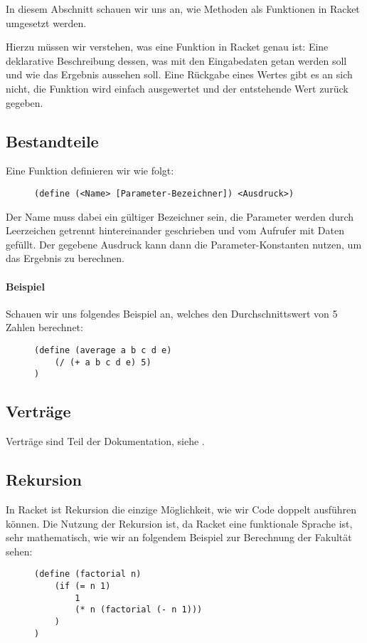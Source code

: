 
In diesem Abschnitt schauen wir uns an, wie Methoden als Funktionen in Racket umgesetzt werden.

Hierzu müssen wir verstehen, was eine Funktion in Racket genau ist: Eine deklarative Beschreibung dessen, was mit den Eingabedaten getan werden soll und wie das Ergebnis aussehen soll. Eine Rückgabe eines Wertes gibt es an sich nicht, die Funktion wird einfach ausgewertet und der entstehende Wert zurück gegeben.

\subsection{Bestandteile} %
	Eine Funktion definieren wir wie folgt:
	\begin{figure}[H]
		\centering
		\lstinline[language = Racket]|(define (<Name> [Parameter-Bezeichner]) <Ausdruck>)|
	\end{figure}
	Der Name muss dabei ein gültiger Bezeichner sein, die Parameter werden durch Leerzeichen getrennt hintereinander geschrieben und vom Aufrufer mit Daten gefüllt. Der gegebene Ausdruck kann dann die Parameter-Konstanten nutzen, um das Ergebnis zu berechnen.
	
	\paragraph{Beispiel}
		Schauen wir uns folgendes Beispiel an, welches den Durchschnittswert von 5 Zahlen berechnet:
		\begin{figure}[H]
			\centering
			\begin{lstlisting}[language = Racket]
(define (average a b c d e)
	(/ (+ a b c d e) 5)
)
\end{lstlisting}
		\end{figure}

\subsection{Verträge}
	Verträge sind Teil der Dokumentation, siehe .

\subsection{Rekursion}
	
	In Racket ist Rekursion die einzige Möglichkeit, wie wir Code doppelt ausführen können. Die Nutzung der Rekursion ist, da Racket eine funktionale Sprache ist, sehr mathematisch, wie wir an folgendem Beispiel zur Berechnung der Fakultät sehen:
	\begin{figure}[H]
		\centering
		\begin{lstlisting}[language = Racket]
(define (factorial n)
	(if (= n 1)
		1
		(* n (factorial (- n 1)))
	)
)
\end{lstlisting}
	\end{figure}
